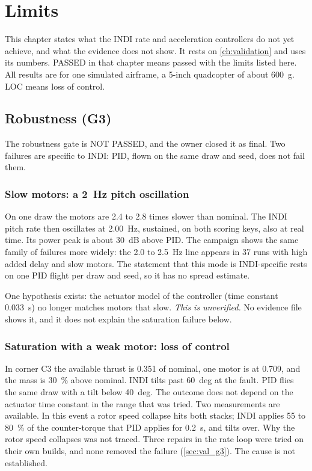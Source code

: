 \chapter{Limits}\label{ch:limits}

This chapter states what the INDI rate and acceleration controllers do not yet achieve, and what the evidence does not show.
It rests on \cref{ch:validation} and uses its numbers.
PASSED in that chapter means passed with the limits listed here.
All results are for one simulated airframe, a 5-inch quadcopter of about 600~g.
LOC means loss of control.

\section{Robustness (G3)}\label{sec:lim_g3}

The robustness gate is NOT PASSED, and the owner closed it as final.
Two failures are specific to INDI: PID, flown on the same draw and seed, does not fail them.

\subsection{Slow motors: a 2~Hz pitch oscillation}

On one draw the motors are 2.4 to 2.8 times slower than nominal.
The INDI pitch rate then oscillates at 2.00~Hz, sustained, on both scoring keys, also at real time.
Its power peak is about 30~dB above PID.
The campaign shows the same family of failures more widely: the 2.0 to 2.5~Hz line appears in 37 runs with high added delay and slow motors.
The statement that this mode is INDI-specific rests on one PID flight per draw and seed, so it has no spread estimate.

One hypothesis exists: the actuator model of the controller (time constant 0.033~s) no longer matches motors that slow.
\emph{This is unverified.}
No evidence file shows it, and it does not explain the saturation failure below.

\subsection{Saturation with a weak motor: loss of control}

In corner C3 the available thrust is 0.351 of nominal, one motor is at 0.709, and the mass is 30~\% above nominal.
INDI tilts past 60~deg at the fault.
PID flies the same draw with a tilt below 40~deg.
The outcome does not depend on the actuator time constant in the range that was tried.
Two measurements are available.
In this event a rotor speed collapse hits both stacks; INDI applies 55 to 80~\% of the counter-torque that PID applies for 0.2~s, and tilts over.
Why the rotor speed collapses was not traced.
Three repairs in the rate loop were tried on their own builds, and none removed the failure (\cref{sec:val_g3}).
The cause is not established.

